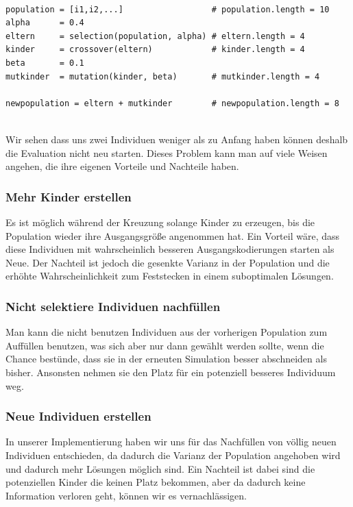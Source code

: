             \begin{mdframed}
            \begin{verbatim}

population = [i1,i2,...]                  # population.length = 10
alpha      = 0.4
eltern     = selection(population, alpha) # eltern.length = 4
kinder     = crossover(eltern)            # kinder.length = 4
beta       = 0.1
mutkinder  = mutation(kinder, beta)       # mutkinder.length = 4

newpopulation = eltern + mutkinder        # newpopulation.length = 8
            \end{verbatim}
            \end{mdframed}
            \hfill \\
            \noindent
            Wir sehen dass uns zwei Individuen weniger als zu Anfang haben können deshalb die Evaluation nicht neu starten. Dieses Problem kann man auf viele Weisen angehen, die ihre eigenen Vorteile und Nachteile haben. 

            \subsubsection*{Mehr Kinder erstellen}
                Es ist möglich während der Kreuzung solange Kinder zu erzeugen, bis die Population wieder ihre Ausgangsgröße angenommen hat. Ein Vorteil wäre, dass diese Individuen mit wahrscheinlich besseren Ausgangskodierungen starten als Neue. Der Nachteil ist jedoch die gesenkte Varianz in der Population und die erhöhte Wahrscheinlichkeit zum Feststecken in einem suboptimalen Lösungen.

            \subsubsection*{Nicht selektiere Individuen nachfüllen}
                Man kann die nicht benutzen Individuen aus der vorherigen Population zum Auffüllen benutzen, was sich aber nur dann gewählt werden sollte, wenn die Chance bestünde, dass sie in der erneuten Simulation besser abschneiden als bisher. Ansonsten nehmen sie den Platz für ein potenziell besseres Individuum weg.

            \subsubsection*{Neue Individuen erstellen}
                In unserer Implementierung haben wir uns für das Nachfüllen von völlig neuen Individuen entschieden, da dadurch die Varianz der Population angehoben wird und dadurch mehr Lösungen möglich sind. Ein Nachteil ist dabei sind die potenziellen Kinder die  keinen Platz bekommen, aber da dadurch keine Information verloren geht, können wir es vernachlässigen.
\newpage

